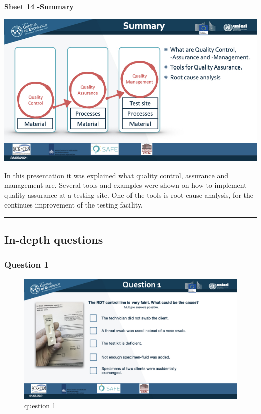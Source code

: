 \documentclass[
]{book}
\begin{document}
\textbf{Sheet 14 -Summary}

\includegraphics{images/m04/m04_Quality_management_v3.014.jpeg}

In this presentation it was explained what quality control, assurance
and management are. Several tools and examples were shown on how to
implement quality assurance at a testing site. One of the tools is root
cause analysis, for the continues improvement of the testing facility.

\begin{center}\rule{0.5\linewidth}{0.5pt}\end{center}

\hypertarget{in-depth-questions-2}{%
\subsection{In-depth questions}\label{in-depth-questions-2}}

\hypertarget{question-1-2}{%
\subsubsection{Question 1}\label{question-1-2}}

\begin{figure}
\centering
\includegraphics{images/m04/m04_questions_v3.001.jpeg}
\caption{question 1}
\end{figure}
\end{document}
